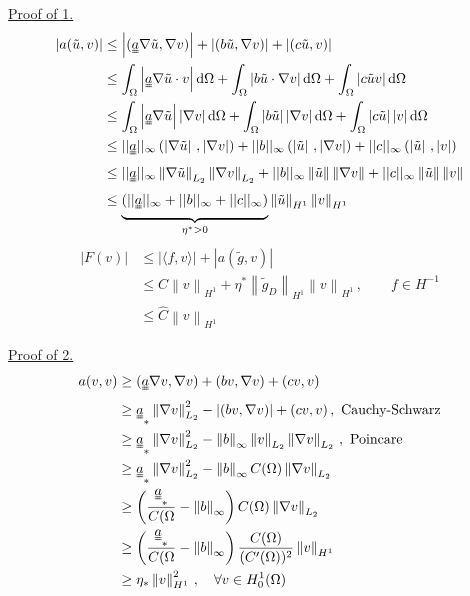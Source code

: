 \documentclass[letterpaper]{article}
\providecommand{\abs}[1]{\left\lvert#1\right\rvert}
\providecommand{\norm}[1]{\left\lVert#1\right\rVert}
\providecommand{\inner}[2]{\left(#1\,,#2\right)}
\def\d{\mathrm{d}}
\begin{document}
\begin{multicols}{2}
\uline{Proof of 1.}
\begin{align*}
\abs{a(\tilde u,v)}&\le\abs{(\uuline{a}\nabla\tilde u,\nabla v)}
+\abs{(b\tilde u,\nabla v)}+\abs{(c\tilde u,v)}\\
&\le\int_\Omega\abs{\uuline{a}\nabla\tilde u\cdot v}\d\Omega
+\int_\Omega\abs{b\tilde u\cdot \nabla v}\d\Omega
+\int_\Omega\abs{c\tilde u v}\d\Omega\\
&\le\int_\Omega\abs{\uuline{a}\nabla\tilde u}\abs{\nabla v}\d\Omega
+\int_\Omega\abs{b\tilde u}\abs{\nabla v}\d\Omega
+\int_\Omega\abs{c\tilde u}\abs{v}\d\Omega\\
&\le||\uuline{a}||_\infty\inner{\abs{\nabla\tilde u}}{\abs{\nabla v}}
+||b||_\infty\inner{\abs{\tilde u}}{\abs{\nabla v}}
+||c||_\infty\inner{\abs{\tilde u}}{\abs{v}}\\
&\le||\uuline{a}||_\infty\norm{\nabla \tilde u}_{L_2}\norm{\nabla v}_{L_2}
+||b||_\infty\norm{\tilde u}\norm{\nabla v}
+||c||_\infty\norm{\tilde u}\norm{v}\\
&\le\underbrace{(||\uuline{a}||_\infty+||b||_\infty+||c||_\infty)}_{\eta^*>0}
\norm{\tilde u}_{H^1}\norm{v}_{H^1}\\
\end{align*}
\begin{align*}
\abs{F(v)}&\le\abs{\langle f,v\rangle}+\abs{a(\tilde g,v)}\\
&\le C\norm{v}_{H^1}+\eta^*\norm{\tilde g_D}_{H^1}\norm{v}_{H^1}\,,\quad\quad f\in H^{-1}\\
&\le \hat C\norm{v}_{H^1}
\end{align*}

\uline{Proof of 2.}
\begin{align*}
a(v,v)&\ge(\uuline{a}\nabla v,\nabla v)+(bv,\nabla v)+(cv,v)\\
&\ge\uuline{a}_*\norm{\nabla v}_{L_2}^2-\abs{(bv,\nabla v)}+(cv,v)\,,
\text{ Cauchy-Schwarz}\\
&\ge\uuline{a}_*\norm{\nabla v}_{L_2}^2
-\norm{b}_\infty\norm{v}_{L_2}\norm{\nabla v}_{L_2}\,,\text{ Poincare}\\
&\ge\uuline{a}_*\norm{\nabla v}_{L_2}^2
-\norm{b}_\infty C(\Omega)\norm{\nabla v}_{L_2}\\
&\ge\left(\frac{\uuline{a}_*}{C(\Omega}
-\norm{b}_\infty\right) C(\Omega)\norm{\nabla v}_{L_2}\\
&\ge\left(\frac{\uuline{a}_*}{C(\Omega}
-\norm{b}_\infty\right)\frac{C(\Omega)}{(C'(\Omega))^2}\norm{v}_{H^1}\\
&\ge\eta_*\norm{v}_{H^1}^2\,,\quad\forall v\in H_0^1(\Omega)
\end{align*}


\end{multicols}
\end{document}
